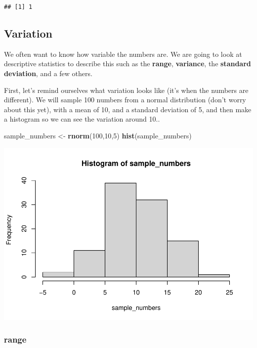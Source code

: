 \documentclass[
]{book}
\newenvironment{Shaded}{\begin{snugshade}}{\end{snugshade}}
\newcommand{\DecValTok}[1]{\textcolor[rgb]{0.00,0.00,0.81}{#1}}
\newcommand{\FunctionTok}[1]{\textcolor[rgb]{0.13,0.29,0.53}{\textbf{#1}}}
\newcommand{\NormalTok}[1]{#1}
\newcommand{\OtherTok}[1]{\textcolor[rgb]{0.56,0.35,0.01}{#1}}
\begin{document}
\begin{verbatim}
## [1] 1
\end{verbatim}

\hypertarget{variation}{%
\subsection{Variation}\label{variation}}

We often want to know how variable the numbers are. We are going to look at descriptive statistics to describe this such as the \textbf{range}, \textbf{variance}, the \textbf{standard deviation}, and a few others.

First, let's remind ourselves what variation looks like (it's when the numbers are different). We will sample 100 numbers from a normal distribution (don't worry about this yet), with a mean of 10, and a standard deviation of 5, and then make a histogram so we can see the variation around 10..

\begin{Shaded}
\begin{Highlighting}[]
\NormalTok{sample\_numbers }\OtherTok{\textless{}{-}} \FunctionTok{rnorm}\NormalTok{(}\DecValTok{100}\NormalTok{,}\DecValTok{10}\NormalTok{,}\DecValTok{5}\NormalTok{)}
\FunctionTok{hist}\NormalTok{(sample\_numbers)}
\end{Highlighting}
\end{Shaded}

\includegraphics{Statistics_Lab_files/figure-latex/unnamed-chunk-81-1.pdf}

\hypertarget{range}{%
\subsubsection{range}\label{range}}
\end{document}
